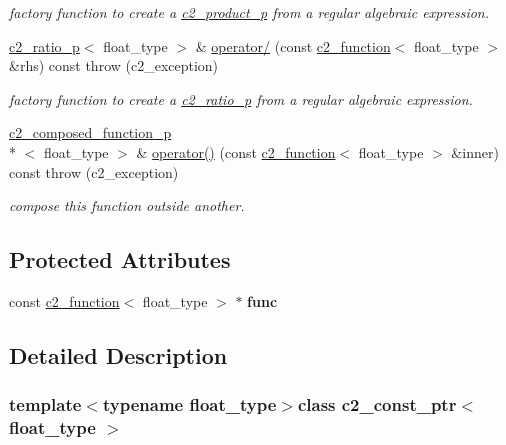 \begin{DoxyCompactItemize}
\begin{DoxyCompactList}\small\item\em factory function to create a \hyperlink{classc2__product__p}{c2\-\_\-product\-\_\-p} from a regular algebraic expression. \end{DoxyCompactList}\item 
\hyperlink{classc2__ratio__p}{c2\-\_\-ratio\-\_\-p}$<$ float\-\_\-type $>$ \& \hyperlink{classc2__const__ptr_ae3487ff977e84cd98e0ae1c495903766}{operator/} (const \hyperlink{classc2__function}{c2\-\_\-function}$<$ float\-\_\-type $>$ \&rhs) const   throw (c2\-\_\-exception)
\begin{DoxyCompactList}\small\item\em factory function to create a \hyperlink{classc2__ratio__p}{c2\-\_\-ratio\-\_\-p} from a regular algebraic expression. \end{DoxyCompactList}\item 
\hyperlink{classc2__composed__function__p}{c2\-\_\-composed\-\_\-function\-\_\-p}\\*
$<$ float\-\_\-type $>$ \& \hyperlink{classc2__const__ptr_a0fc370d82f1077fa7054e1a10a93ed6c}{operator()} (const \hyperlink{classc2__function}{c2\-\_\-function}$<$ float\-\_\-type $>$ \&inner) const   throw (c2\-\_\-exception)
\begin{DoxyCompactList}\small\item\em compose this function outside another. \end{DoxyCompactList}\end{DoxyCompactItemize}
\subsection*{Protected Attributes}
\begin{DoxyCompactItemize}
\item 
\hypertarget{classc2__const__ptr_a6de6b341a9e28137557dbe496813e415}{const \hyperlink{classc2__function}{c2\-\_\-function}$<$ float\-\_\-type $>$ $\ast$ {\bfseries func}}\label{classc2__const__ptr_a6de6b341a9e28137557dbe496813e415}

\end{DoxyCompactItemize}


\subsection{Detailed Description}
\subsubsection*{template$<$typename float\-\_\-type$>$class c2\-\_\-const\-\_\-ptr$<$ float\-\_\-type $>$}

